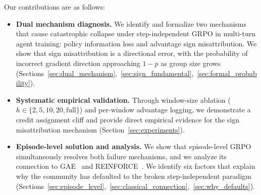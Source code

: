 Our contributions are as follows:
\begin{itemize}
    \item \textbf{Dual mechanism diagnosis.} We identify and formalize two mechanisms that cause catastrophic collapse under step-independent GRPO in multi-turn agent training: policy information loss and advantage sign misattribution. We show that sign misattribution is a directional error, with the probability of incorrect gradient direction approaching $1 - p$ as group size grows (Sections~\ref{sec:dual_mechanism},~\ref{sec:sign_fundamental},~\ref{sec:formal_probability}).

    \item \textbf{Systematic empirical validation.} Through window-size ablation ($h \in \{2, 5, 10, 20, \text{full}\}$) and per-window advantage logging, we demonstrate a credit assignment cliff and provide direct empirical evidence for the sign misattribution mechanism (Section~\ref{sec:experiments}).

    \item \textbf{Episode-level solution and analysis.} We show that episode-level GRPO simultaneously resolves both failure mechanisms, and we analyze its connection to GAE~\cite{schulman2016gae} and REINFORCE~\cite{williams1992reinforce}. We identify six factors that explain why the community has defaulted to the broken step-independent paradigm (Sections~\ref{sec:episode_level},~\ref{sec:classical_connection},~\ref{sec:why_defaults}).
\end{itemize}
